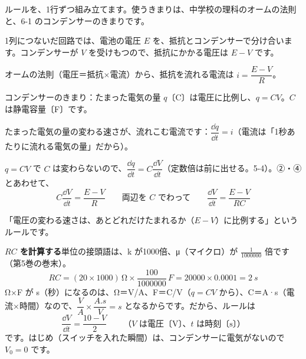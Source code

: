 ルールを、1行ずつ組み立てます。使うきまりは、中学校の理科のオームの法則と、6-1 のコンデンサーのきまりです。
\begin{enumerate}[label={\bkcircled[\bkTF]{\arabic*}}, leftmargin=2.4\zw, itemsep=2pt, topsep=2pt]
\item 1列につないだ回路では、電池の電圧 $E$ を、抵抗とコンデンサーで分け合います。コンデンサーが $V$ を受けもつので、抵抗にかかる電圧は $E-V$ です。
\item オームの法則（電圧＝抵抗×電流）から、抵抗を流れる電流は $i=\dfrac{E-V}{R}$。
\item コンデンサーのきまり：たまった電気の量 $q$〔C〕は電圧に比例し、$q=CV$。$C$ は静電容量〔F〕です。
\item たまった電気の量の変わる速さが、流れこむ電流です：$\dfrac{\dd q}{\dd t}=i$（電流は「1秒あたりに流れる電気の量」だから）。
\item $q=CV$ で $C$ は変わらないので、$\dfrac{\dd q}{\dd t}=C\dfrac{\dd V}{\dd t}$（定数倍は前に出せる。5-4）。②・④とあわせて、
\[ C\frac{\dd V}{\dd t}=\frac{E-V}{R}\qquad\text{両辺を $C$ でわって}\qquad \frac{\dd V}{\dd t}=\frac{E-V}{RC} \]
\end{enumerate}
「電圧の変わる速さは、あとどれだけたまれるか（$E-V$）に比例する」というルールです。

\noindent\textbf{$RC$ を計算する}\quad 単位の接頭語は、k が1000倍、μ（マイクロ）が $\frac{1}{\num{1000000}}$ 倍です（第5巻の巻末）。
\[ RC=(20\times1000)\,\unit{\ohm}\times\frac{100}{\num{1000000}}\,\unit{F}=\num{20000}\times0.0001=\qty{2}{s} \]
Ω×F が s（秒）になるのは、Ω＝V/A、F＝C/V（$q=CV$ から）、C＝A·s（電流×時間）なので、$\dfrac{\unit{V}}{\unit{A}}\times\dfrac{\unit{A.s}}{\unit{V}}=\unit{s}$ となるからです。だから、ルールは
\[ \frac{\dd V}{\dd t}=\frac{10-V}{2}\qquad\text{（$V$ は電圧〔V〕、$t$ は時刻〔s〕）} \]
です。はじめ（スイッチを入れた瞬間）は、コンデンサーに電気がないので $V_0=0$ です。

